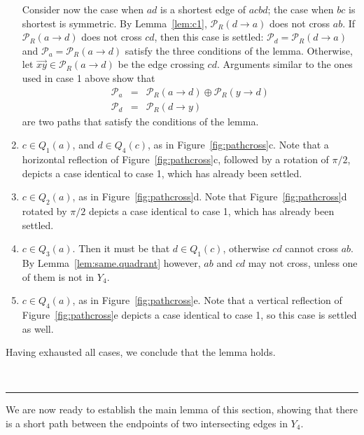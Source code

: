 \pdfoutput=1  \documentclass[11pt]{article}
\newcommand{\qed}{\rule{0.5em}{1.5ex}}
\newcommand{\fqed}{{\hfill~\qed}}
\newenvironment{proof}{{\noindent \bf Proof.}}
                      {{\hfill \fqed} \vspace{1em}}
\newcommand{\Pa}{{\mathcal P}}
\begin{document}
\begin{proof}
\begin{enumerate}
Consider now the case when $ad$ is a shortest edge of $acbd$; the case
when $bc$ is shortest is symmetric.
By
Lemma~\ref{lem:c1},
$\Pa_R(d \rightarrow a)$ does not cross $ab$.
If $\Pa_R(a \rightarrow d)$ does not cross $cd$, then this case is settled:
$\Pa_d = \Pa_R(d \rightarrow a)$ and $\Pa_a = \Pa_R(a \rightarrow d)$ satisfy the three conditions
of the lemma. Otherwise, let $\overrightarrow{xy} \in \Pa_R(a \rightarrow d)$
be the edge crossing $cd$. Arguments similar to the ones used in case 1 above show that
\begin{eqnarray*}
\Pa_a & = & \Pa_R(a \rightarrow d) \oplus \Pa_R(y \rightarrow d) \\
\Pa_d & = & \Pa_R(d \rightarrow y)
\end{eqnarray*}
are two paths that satisfy the conditions of the lemma.

\item $c \in Q_1(a)$, and $d \in Q_4(c)$, as in Figure~\ref{fig:pathcross}c.
Note that a horizontal reflection of Figure~\ref{fig:pathcross}c, followed
by a rotation of $\pi/2$, depicts a case identical to case 1, which has
already been settled.

\item $c \in Q_2(a)$, as in Figure~\ref{fig:pathcross}d.
Note that Figure~\ref{fig:pathcross}d rotated by $\pi/2$ depicts
a case identical to case 1, which has already been settled.

\item $c \in Q_3(a)$. Then it must be that $d \in Q_1(c)$, otherwise
$cd$ cannot cross $ab$. By Lemma~\ref{lem:same.quadrant} however,
$ab$ and $cd$ may not cross, unless one of them is not in $Y_4$.

\item $c \in Q_4(a)$, as in Figure~\ref{fig:pathcross}e.
Note that a vertical reflection of Figure~\ref{fig:pathcross}e depicts
a case identical to case 1, so this case is settled as well.
\end{enumerate}
Having exhausted all cases, we conclude that the lemma holds.
\end{proof}

\noindent
We are now ready to establish the main lemma of this section, showing
that there is a short path between the endpoints of two intersecting
edges in $Y_4$.
\end{document}
